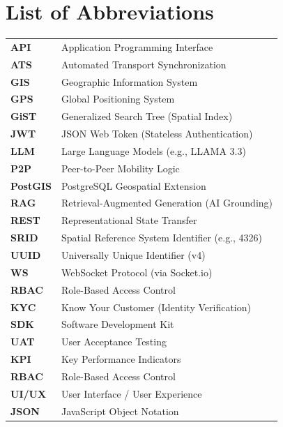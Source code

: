 \chapter*{List of Abbreviations}

\noindent
\begin{tabular}{lp{10cm}}
\textbf{API}     & Application Programming Interface \\
\textbf{ATS}     & Automated Transport Synchronization \\
\textbf{GIS}     & Geographic Information System \\
\textbf{GPS}     & Global Positioning System \\
\textbf{GiST}    & Generalized Search Tree (Spatial Index) \\
\textbf{JWT}     & JSON Web Token (Stateless Authentication) \\
\textbf{LLM}     & Large Language Models (e.g., LLAMA 3.3) \\
\textbf{P2P}     & Peer-to-Peer Mobility Logic \\
\textbf{PostGIS} & PostgreSQL Geospatial Extension \cite{postgis} \\
\textbf{RAG}     & Retrieval-Augmented Generation (AI Grounding) \\
\textbf{REST}    & Representational State Transfer \\
\textbf{SRID}    & Spatial Reference System Identifier (e.g., 4326) \\
\textbf{UUID}    & Universally Unique Identifier (v4) \\
\textbf{WS}      & WebSocket Protocol (via Socket.io) \\
\textbf{RBAC}    & Role-Based Access Control \\
\textbf{KYC}     & Know Your Customer (Identity Verification) \\
\textbf{SDK}     & Software Development Kit \\
\textbf{UAT}     & User Acceptance Testing \\
\textbf{KPI}     & Key Performance Indicators \\
\textbf{RBAC}    & Role-Based Access Control \\
\textbf{UI/UX}   & User Interface / User Experience \\
\textbf{JSON}    & JavaScript Object Notation \\
\end{tabular}
